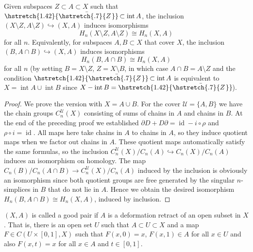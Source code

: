 \documentclass[english,letterpaper]{article}%
\numberwithin{equation}{section}
\numberwithin{figure}{section}
\numberwithin{table}{section}
\theoremstyle{definition}
\theoremstyle{definition}
\theoremstyle{definition}
\theoremstyle{plain}
\theoremstyle{plain}
\theoremstyle{plain}
\theoremstyle{plain}
\theoremstyle{remark}
\theoremstyle{remark}
\def\red{\color{red}}
\newcommand{\calU}{\mathcal{U}}
\DeclareMathOperator{\id}{id}
\DeclareMathOperator{\Int}{int}
\newcommand{\PRLsep}{   %
           \noindent\makebox[\linewidth]{
                \resizebox{0.5\linewidth}{1pt}{$\blacklozenge$}}}
\newcommand\wb[1]{\hstretch{1.42}{\bar{\hstretch{.7}{#1\mkern2mu}}}\mkern-2mu}
\begin{document}
\begin{thm}[Excision]
    Given subspaces $Z\subset A\subset X$ such that $\wb{Z}\subset \Int A$, the inclusion $(X\setminus Z,A\setminus Z)\hookrightarrow (X,A)$ induces isomorphisms 
    \[H_n(X\setminus Z,A\setminus Z)\cong H_n(X,A)\]
    for all $n$. Equivalently, for subspaces $A,B\subset X$ that cover $X$, the inclusion $(B,A\cap B)\hookrightarrow (X,A)$ induces isomorphisms
    \[H_n(B,A\cap B)\cong H_n(X,A)\]
    for all $n$ (by setting $B=X\setminus Z$, $Z=X\setminus B$, in which case $A\cap B=A\setminus Z$ and the condition $\wb{Z}\subset \Int A$ is equivalent to $X=\Int A\cup\Int B$ since $X-\Int B=\wb{Z}$).
\end{thm}
\begin{proof}
     We prove the version with $X=A\cup B$. For the cover $\calU=\{A,B\}$ we have the chain groups $C_n^\calU(X)$ consisting of sums of chains in $A$ and chains in $B$. At the end of the preceding proof we established $\partial D+D\partial=\id-i\circ\rho$ and $\rho\circ i=\id$. All maps here take chains in $A$ to chains in $A$, so they induce  quotient maps when we factor out chains in $A$. These quotient maps automatically satisfy the same formulas, so the inclusion $C^\calU_n(X)/C_n(A)\hookrightarrow C_n(X)/C_n(A)$ induces an isomorphism on homology. The map $C_n(B)/C_n(A\cap B)\to C_n^\calU(X)/C_n(A)$ induced by the inclusion is obviously an isomorphism since both quotient groups are free generated by the singular $n$-simplices in $B$ that do not lie in $A$. Hence we obtain the desired isomorphism $H_n(B,A\cap B)\cong H_n(X,A)$, induced by inclusion.
\end{proof}

\begin{defn}
    $(X,A)$ is called a good pair if $A$ is a deformation retract of an open subset in $X$. That is, there is an open set $U$ such that $A\subset U\subset X$ and a map $F\in C(U\times[0,1],X)$ such that $F(x,0)=x$, $F(x,1)\in A$ for all $x\in U$ and also $F(x,t)=x$ for all $x\in A$ and $t\in [0,1]$.
\end{defn}
\end{document}
